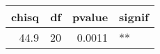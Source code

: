 
\begin{tabular}{rrrl}
\toprule
chisq & df & pvalue & signif\\
\midrule
44.9 & 20 & 0.0011 & **\\
\bottomrule
\end{tabular}
